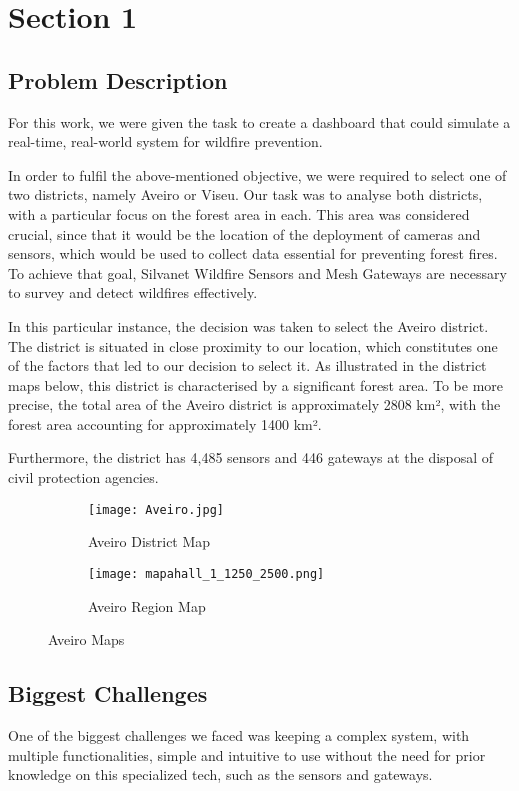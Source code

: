 \chapter{Section 1} \label{section1}
\section{Problem Description}
For this work, we were given the task to create a dashboard 
that could simulate a real-time, real-world system for wildfire 
prevention. \par
In order to fulfil the above-mentioned objective, 
we were required to select one of two districts, 
namely Aveiro or Viseu. Our task was to analyse both districts, 
with a particular focus on the forest area in each. 
This area was considered crucial, since that it would be 
the location of the deployment of cameras and sensors, 
which would be used to collect data essential for preventing forest fires. 
To achieve
that goal, Silvanet Wildfire Sensors and Mesh Gateways are necessary to
survey and detect wildfires effectively. \par
In this particular instance, the decision was taken to select the Aveiro district. The district is situated in close proximity to our location, which constitutes one of the factors that led to our decision to select it. As illustrated in the district maps below, this district is characterised by a significant forest area. To be more precise, the total area of the Aveiro district is approximately 2808 km², with the forest area accounting for approximately 1400 km². \par
Furthermore, the district has 4,485 sensors and 446 gateways at the disposal of civil protection agencies. \par
\begin{figure}[H]
    \centering
    \begin{subfigure}[b]{0.5\textwidth}
        \centering 
        \texttt{[image: Aveiro.jpg]}
        \caption{Aveiro District Map}
    \end{subfigure}%
    \begin{subfigure}[b]{0.5\textwidth}
        \centering 
        \texttt{[image: mapahall\_1\_1250\_2500.png]}
        \caption{Aveiro Region Map}
    \end{subfigure}
    \caption{Aveiro Maps}
\end{figure}
\section{Biggest Challenges}
One of the biggest challenges we faced was keeping a complex system, with multiple functionalities, simple
and intuitive to use without the need for prior knowledge on this
specialized tech, such as the sensors and gateways. 
